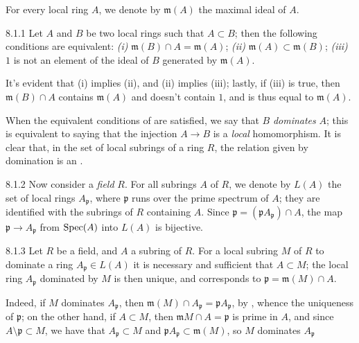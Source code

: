 \documentclass[../main.tex]{subfiles}
\begin{document}
For every local ring $A$, we denote by $\mathfrak{m}(A)$ the maximal ideal of $A$.

\begin{env}[Lemma]{8.1.1}
    Let $A$ and $B$ be two local rings such that $A\subset B$; then the following conditions are equivalent: \emph{(i)} $\mathfrak{m}(B)\cap A=\mathfrak{m}(A)$; \emph{(ii)} $\mathfrak{m}(A)\subset\mathfrak{m}(B)$; \emph{(iii)} $1$ is not an element of the ideal of $B$ generated by $\mathfrak{m}(A)$.
\end{env}

It's evident that (i) implies (ii), and (ii) implies (iii); lastly, if (iii) is true, then $\mathfrak{m}(B)\cap A$ contains $\mathfrak{m}(A)$ and doesn't contain $1$, and is thus equal to $\mathfrak{m}(A)$.

When the equivalent conditions of  are satisfied, we say that $B$ \emph{dominates} $A$; this is equivalent to saying that the injection $A\to B$ is a \emph{local} homomorphism.
It is clear that, in the set of local subrings of a ring $R$, the relation given by domination is an .

\begin{env}{8.1.2}
    Now consider a \emph{field} $R$.
    For all subrings $A$ of $R$, we denote by $L(A)$ the set of local rings $A_\mathfrak{p}$, where $\mathfrak{p}$ runs over the prime spectrum of $A$; they are identified with the subrings of $R$ containing $A$.
    Since $\mathfrak{p}=(\mathfrak{p}A_\mathfrak{p})\cap A$, the map $\mathfrak{p}\to A_\mathfrak{p}$ from $\operatorname{Spec}(A)$ into $L(A)$ is bijective.
\end{env}

\begin{env}[Lemma]{8.1.3}
    Let $R$ be a field, and $A$ a subring of $R$.
    For a local subring $M$ of $R$ to dominate a ring $A_\mathfrak{p}\in L(A)$ it is necessary and sufficient that $A\subset M$; the local ring $A_\mathfrak{p}$ dominated by $M$ is then unique, and corresponds to $\mathfrak{p}=\mathfrak{m}(M)\cap A$.
\end{env}

Indeed, if $M$ dominates $A_\mathfrak{p}$, then $\mathfrak{m}(M)\cap A_\mathfrak{p}=\mathfrak{p}A_\mathfrak{p}$, by , whence the uniqueness of $\mathfrak{p}$; on the other hand, if $A\subset M$, then $\mathfrak{m}M\cap A=\mathfrak{p}$ is prime in $A$, and since $A\setminus\mathfrak{p}\subset M$, we have that $A_\mathfrak{p}\subset M$ and $\mathfrak{p}A_\mathfrak{p}\subset\mathfrak{m}(M)$, so $M$ dominates $A_\mathfrak{p}$
\end{document}
